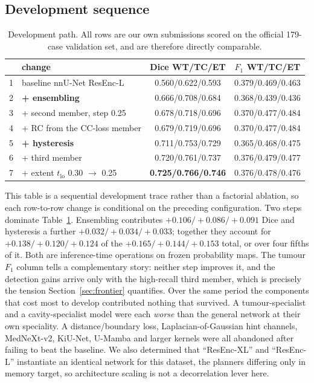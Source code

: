 \documentclass[runningheads]{llncs}
\begin{document}
\subsection{Development sequence}
\label{sec:ablation}

\begin{table}[t]
\centering
\caption{Development path. All rows are our own submissions scored on the official 179-case
validation set, and are therefore directly comparable.}
\label{tab:ablation}
\begin{tabular}{@{}llcc@{}}
\toprule
 & change & Dice WT/TC/ET & $F_1$ WT/TC/ET \\
\midrule
1 & baseline nnU-Net ResEnc-L      & 0.560/0.622/0.593 & 0.379/0.469/0.463 \\
2 & \textbf{+ ensembling}          & 0.666/0.708/0.684 & 0.368/0.439/0.436 \\
3 & + second member, step 0.25     & 0.678/0.718/0.696 & 0.370/0.477/0.484 \\
4 & + RC from the CC-loss member   & 0.679/0.719/0.696 & 0.370/0.477/0.484 \\
5 & \textbf{+ hysteresis}          & 0.711/0.753/0.729 & 0.365/0.468/0.475 \\
6 & + third member                 & 0.720/0.761/0.737 & 0.376/0.479/0.477 \\
7 & + extent $t_{\mathrm{lo}}$ 0.30 $\to$ 0.25  & \textbf{0.725/0.766/0.746} & 0.376/0.478/0.476 \\
\bottomrule
\end{tabular}
\end{table}

This table is a sequential development trace rather than a factorial ablation, so each row-to-row
change is conditional on the preceding configuration. Two steps dominate Table~\ref{tab:ablation}. Ensembling contributes $+0.106/+0.086/+0.091$ Dice
and hysteresis a further $+0.032/+0.034/+0.033$; together they account for $+0.138/+0.120/+0.124$
of the $+0.165/+0.144/+0.153$ total, or over four fifths of it. Both are inference-time operations
on frozen probability maps. The tumour $F_1$ column tells a complementary story: neither step
improves it, and the detection gains arrive only with the high-recall third member, which is
precisely the tension Section~\ref{sec:frontier} quantifies. Over the same period the components that cost most
to develop contributed nothing that survived. A tumour-specialist and a cavity-specialist model
were each \emph{worse} than the general network at their own speciality. A distance/boundary
loss, Laplacian-of-Gaussian hint channels, MedNeXt-v2, KiU-Net, U-Mamba and larger kernels were
all abandoned after failing to beat the baseline. We also determined that ``ResEnc-XL'' and
``ResEnc-L'' instantiate an identical network for this dataset, the planners differing only in
memory target, so architecture scaling is not a decorrelation lever here.
\end{document}
